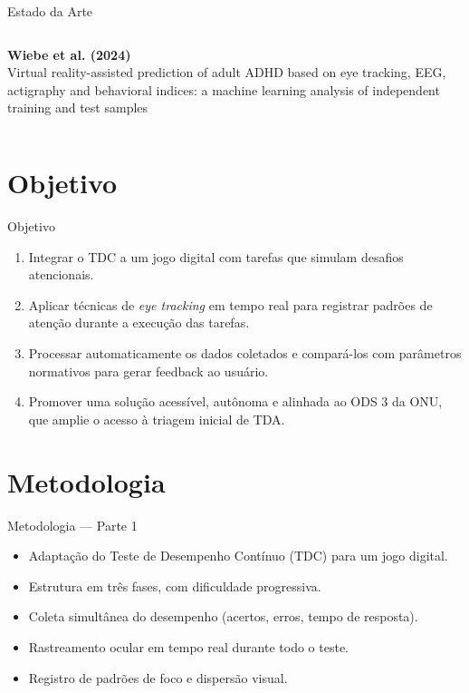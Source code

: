 \documentclass{beamer}
\begin{document}
\begin{frame}{Estado da Arte}
\begin{columns}[T,onlytextwidth]
\begin{column}{0.48\textwidth}
        \vspace{0.4cm}
        \textbf{Wiebe et al. (2024)}\\
        {\small
        Virtual reality-assisted prediction of adult ADHD based on eye tracking, EEG, actigraphy and behavioral indices: a machine learning analysis of independent training and test samples
        }
    \end{column}

\end{columns}

\end{frame}

\section{Objetivo}
\begin{frame}{Objetivo}
\justifying
\begin{enumerate}
  \item Integrar o TDC a um jogo digital com tarefas que
  simulam desafios atencionais.
  \item  Aplicar técnicas de \textit{eye tracking} em tempo real para registrar padrões de
  atenção durante a execução das tarefas.
  \item Processar automaticamente os dados coletados e compará-los com parâmetros
  normativos para gerar feedback ao usuário.
  \item Promover uma solução acessível, autônoma e alinhada ao ODS 3 da ONU, que amplie
  o acesso à triagem inicial de TDA.
\end{enumerate}
\end{frame}

\section{Metodologia}

\begin{frame}{Metodologia — Parte 1}
\justifying

\begin{itemize}
    \item Adaptação do Teste de Desempenho Contínuo (TDC) para um jogo digital.
    \item Estrutura em três fases, com dificuldade progressiva.
    \item Coleta simultânea do desempenho (acertos, erros, tempo de resposta).
    \item Rastreamento ocular em tempo real durante todo o teste.
    \item Registro de padrões de foco e dispersão visual.
\end{itemize}

\end{frame}
\end{document}
